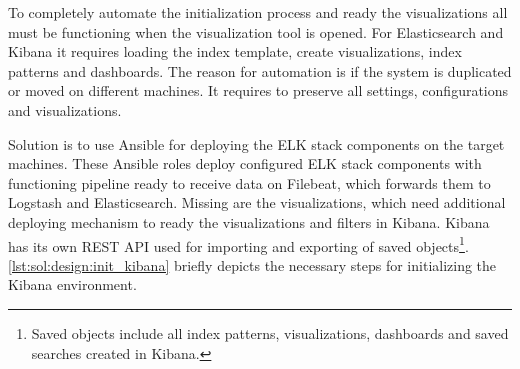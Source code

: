 \documentclass[12pt,a4paper,twoside]{report}
\begin{document}
				To completely automate the initialization process and ready the visualizations all must be functioning when the visualization tool is opened. For Elasticsearch and Kibana it requires loading the index template, create visualizations, index patterns and dashboards. The reason for automation is if the system is duplicated or moved on different machines. It requires to preserve all settings, configurations and visualizations.\par
				Solution is to use Ansible for deploying the ELK stack components on the target machines. These Ansible roles deploy configured ELK stack components with functioning pipeline ready to receive data on Filebeat, which forwards them to Logstash and Elasticsearch. Missing are the visualizations, which need additional deploying mechanism to ready the visualizations and filters in Kibana. Kibana has its own REST API used for importing and exporting of saved objects\footnote{Saved objects include all index patterns, visualizations, dashboards and saved searches created in Kibana.}. \autoref{lst:sol:design:init_kibana} briefly depicts the necessary steps for initializing the Kibana environment.				
				
				
\end{document}
